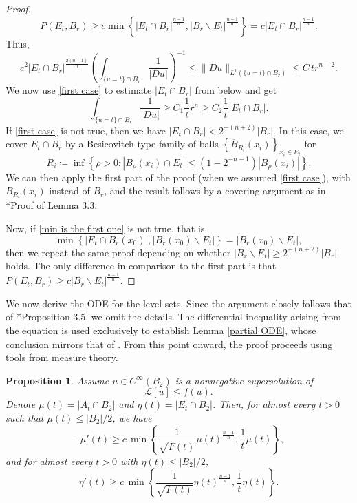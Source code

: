 \documentclass[12pt,a4paper]{amsart}
\numberwithin{equation}{section} %
\newtheorem{proposition}[theorem]{Proposition}
\theoremstyle{definition}
\theoremstyle{remark}
\begin{document}
\begin{proof}
$$
    P(E_t,B_r) \geq c \min\left\{|E_t \cap B_r|^{\frac{n-1}{n}},|B_r \backslash E_t|^{\frac{n-1}{n}} \right\} = c |E_t \cap B_r|^{\frac{n-1}{n}}.
$$
Thus,
$$
   c^2 |E_t \cap B_r|^{\frac{2(n-1)}{n}} \left(\int_{\{u=t\}\cap B_r}\frac{1}{|Du|} \right)^{-1} \leq \|Du\|_{L^1(\{u=t \}\cap B_r)} \leq C\, tr^{n-2}.
$$
We now use \eqref{first case} to estimate $|E_t \cap B_r|$ from below and get
$$
    \int_{\{u=t\}\cap B_r}\frac{1}{|Du|}  \geq C_1 \frac{1}{t}r^n \geq C_2 \frac{1}{t}|E_t \cap B_r|.
$$
If \eqref{first case} is not true, then we have $|E_t \cap B_r| < 2^{-(n+2)}|B_r|$. In this case, we cover $E_t \cap B_r$ by a Besicovitch-type family of balls $\left\{\overline{B}_{R_i}(x_i)\right\}_{x_i \in E_t}$ for 
$$
    R_i \coloneqq \inf\left\{ \rho > 0 \colon |B_\rho(x_i)\cap E_t|\leq \left(1-2^{-n-1}\right)|B_\rho(x_i)|\right\}.
$$
We can then apply the first part of the proof (when we assumed \eqref{first case}), with $B_{R_i}(x_i)$ instead of $B_r$, and the result follows by a covering argument as in \cite{VJ1}*{Proof of Lemma 3.3}.

Now, if \eqref{min is the first one} is not true, that is
\begin{equation*}
    \min \left\{|E_t \cap B_r(x_0)|, |B_r(x_0) \backslash E_t| \right\} = |B_r(x_0) \backslash E_t|,
\end{equation*}
then we repeat the same proof depending on whether $|B_r \backslash E_t| \geq 2^{-(n+2)}|B_r|$ holds. The only difference in comparison to the first part is that $P(E_t, B_r) \geq c|B_r \backslash E_t|^{\frac{n-1}{n}}$.
\end{proof}

We now derive the ODE for the level sets. Since the argument closely follows that of \cite{VJ1}*{Proposition 3.5}, we omit the details. The differential inequality arising from the equation is used exclusively to establish Lemma \ref{partial ODE}, whose conclusion mirrors that of \cite{VJ1}. From this point onward, the proof proceeds using tools from measure theory.

\begin{proposition}\label{ODE for level sets}
Assume $u \in C^\infty(B_2)$ is a nonnegative supersolution of
$$
    \mathcal{L}[u] \leq f(u).
$$
Denote $\mu(t) = |A_t \cap B_2|$ and $\eta(t) = |E_t \cap B_2|$. Then, for almost every $t>0$ such that $\mu(t) \leq |B_2|/2$, we have 
$$
    -\mu'(t) \geq c\, \min\left\{\frac{1}{\sqrt{F(t)}}\mu(t)^{\frac{n-1}{n}}, \frac{1}{t}\mu(t) \right\},
$$
and for almost every $t>0$ with $\eta(t) \leq |B_2|/2$, 
$$
    \eta'(t) \geq c\, \min\left\{\frac{1}{\sqrt{F(t)}}\eta(t)^{\frac{n-1}{n}}, \frac{1}{t}\eta(t) \right\}.
$$
\end{proposition}
\end{document}

